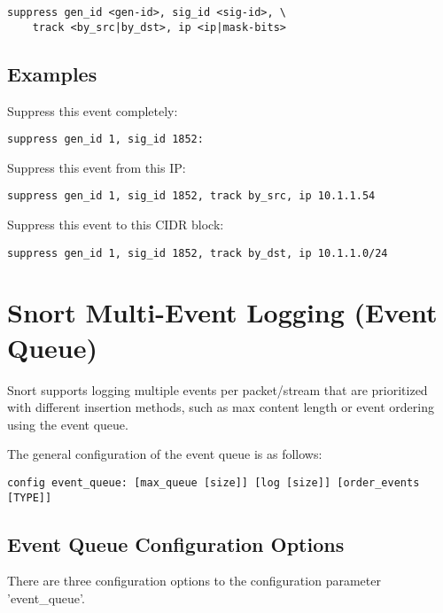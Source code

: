 \documentclass[english]{report}
\begin{document}
\begin{verbatim}
suppress gen_id <gen-id>, sig_id <sig-id>, \
    track <by_src|by_dst>, ip <ip|mask-bits>
\end{verbatim}

\subsection{Examples}
Suppress this event completely:
\begin{verbatim}
suppress gen_id 1, sig_id 1852:
\end{verbatim}

Suppress this event from this IP:
\begin{verbatim}
suppress gen_id 1, sig_id 1852, track by_src, ip 10.1.1.54
\end{verbatim}

Suppress this event to this CIDR block:
\begin{verbatim}
suppress gen_id 1, sig_id 1852, track by_dst, ip 10.1.1.0/24
\end{verbatim}

\clearpage
\section{Snort Multi-Event Logging (Event Queue)\label{eventqueue}}

Snort supports logging multiple events per packet/stream that are prioritized
with different insertion methods, such as max content length or event
ordering using the event queue.

The general configuration of the event queue is as follows:

\begin{verbatim}
config event_queue: [max_queue [size]] [log [size]] [order_events [TYPE]]
\end{verbatim}

\subsection{Event Queue Configuration Options}

There are three configuration options to the configuration parameter
'event\_queue'.
\end{document}

